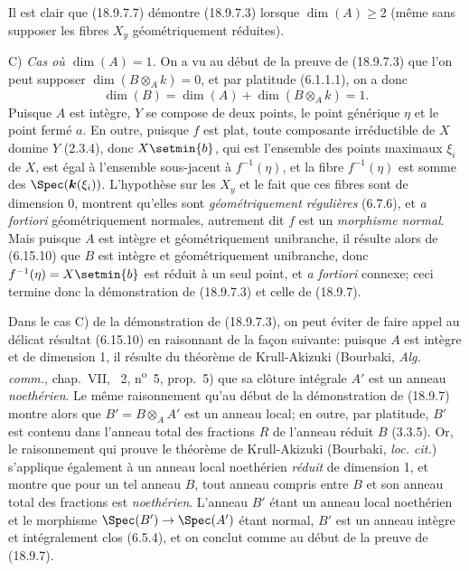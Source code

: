 Il est clair que (18.9.7.7) démontre (18.9.7.3) lorsque $\dim(A)\geq 2$ (même sans supposer les fibres $X_y$ géométriquement réduites).

C) \emph{Cas où $\dim(A)=1$.} On a vu au début de la preuve de (18.9.7.3) que l'on peut supposer $\dim(B\otimes_A k)=0$, et par platitude (6.1.1.1), on a donc
\[
  \dim(B)=\dim(A)+\dim(B\otimes_A k)=1.
\]
Puisque $A$ est intègre, $Y$ se compose de deux points, le point générique $\eta$ et le point fermé $a$. En outre, puisque $f$ est plat, toute composante irréductible de $X$ domine $Y$ (2.3.4), donc $X\setmin\{b\}$, qui est l'ensemble des points maximaux $\xi_i$ de $X$, est égal à
l'ensemble sous-jacent à $f^{-1}(\eta)$, et la fibre $f^{-1}(\eta)$ est somme des $\Spec(\boldsymbol{k}(\xi_i))$. L'hypothèse sur les $X_y$ et le fait que ces fibres sont de dimension 0, montrent qu'elles sont \emph{géométriquement régulières} (6.7.6), et \emph{a fortiori} géométriquement normales, autrement dit $f$ est un \emph{morphisme normal}. Mais puisque $A$ est intègre et géométriquement unibranche, il résulte alors de (6.15.10) que $B$ est intègre et géométriquement unibranche, donc $f^{-1}(\eta)=X\setmin\{b\}$ est réduit à un seul point, et \emph{a fortiori} connexe; ceci termine donc la démonstration de (18.9.7.3) et celle de (18.9.7).

\begin{remark}[18.9.7.8]
\label{IV.18.9.7.8}
Dans le cas C) de la démonstration de (18.9.7.3), on peut éviter de faire appel au délicat résultat (6.15.10) en raisonnant de la façon suivante: puisque $A$ est intègre et de dimension 1, il résulte du théorème de Krull-Akizuki (Bourbaki, \emph{Alg. comm.}, chap.~VII, \textsection~2, n\textsuperscript{o}~5, prop.~5) que sa clôture intégrale $A'$ est un anneau \emph{noethérien}. Le même raisonnement qu'au début de la démonstration de (18.9.7) montre alors que $B'=B\otimes_A A'$ est un anneau local; en outre, par platitude, $B'$ est contenu dans l'anneau total des fractions $R$ de l'anneau réduit $B$ (3.3.5). Or, le raisonnement qui prouve le théorème de Krull-Akizuki (Bourbaki, \emph{loc. cit.}) s'applique également à un anneau local noethérien \emph{réduit} de dimension 1, et montre que pour un tel anneau $B$, tout anneau compris entre $B$ et son anneau total des fractions est \emph{noethérien}. L'anneau $B'$ étant un anneau local noethérien et le morphisme $\Spec(B')\to\Spec(A')$ étant normal, $B'$ est un anneau intègre et intégralement clos (6.5.4), et on conclut comme au début de la preuve de (18.9.7).
\end{remark}

